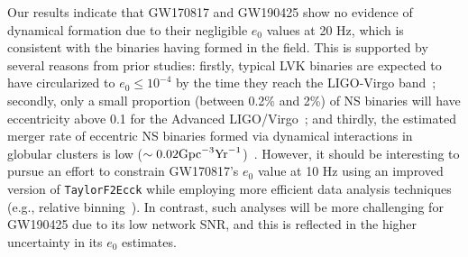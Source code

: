 \documentclass[aps,prd,twocolumn,superscriptaddress,groupedaddress,nofootinbib,showpacs,eqsecnum,useAms]{revtex4-2}
\begin{document}
Our results indicate that GW170817 and GW190425 show no evidence of dynamical formation due to their negligible $e_0$ values at 20 Hz, which is consistent with the binaries having formed in the field.
This is supported by several reasons from prior studies: firstly, typical LVK binaries are expected to have circularized to $e_0 \leq 10^{-4}$ by the time they reach the LIGO-Virgo band~\cite{Peters64, Kowalska11}; secondly, only a small proportion (between 0.2\% and 2\%) of NS binaries will have eccentricity above 0.1 for the Advanced LIGO/Virgo~\cite{Peters64}; and thirdly, the estimated merger rate of eccentric NS binaries formed via dynamical interactions in globular clusters is low ($\sim 0.02 {\rm Gpc}^{-3}{\rm Yr}^{-1}$)~\cite{Ye2019}.
However, it should be interesting to pursue an effort to 
 constrain GW170817's $e_0$ value  at 10 Hz using an improved version of \texttt{TaylorF2Ecck} 
 while employing more 
 efficient data analysis techniques (e.g., relative binning~\cite{zackay2018}). In contrast, such analyses will be more challenging for GW190425 due to its low network SNR, and this is reflected in the higher uncertainty in its $e_0$ estimates.
\end{document}
